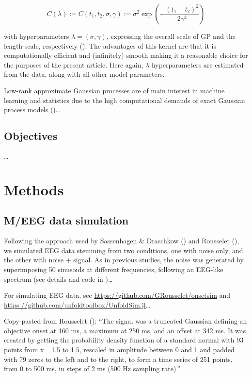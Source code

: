 \documentclass[
  doc,
  floatsintext,
  longtable,
  a4paper,
  nolmodern,
  notxfonts,
  notimes,
  colorlinks=true,linkcolor=blue,citecolor=blue,urlcolor=blue]{apa7}
\begin{document}
\[
C(\lambda):=C\left(t_1, t_2, \sigma, \gamma\right):=\sigma^2 \exp \left(-\frac{\left(t_1-t_2\right)^2}{2 \gamma^2}\right)
\]

with hyperparameters \(\lambda=(\sigma, \gamma)\), expressing the
overall scale of GP and the length-scale, respectively
(). The
advantages of this kernel are that it is computationally efficient and
(infinitely) smooth making it a reasonable choice for the purposes of
the present article. Here again, \(\lambda\) hyperparameters are
estimated from the data, along with all other model parameters.

Low-rank approximate Gaussian processes are of main interest in machine
learning and statistics due to the high computational demands of exact
Gaussian process models
()\ldots{}

\subsection{Objectives}\label{objectives}

\ldots{}

\section{Methods}\label{methods}

\subsection{M/EEG data simulation}\label{meeg-data-simulation}

Following the approach used by Sassenhagen \& Draschkow
() and Rousselet
(), we simulated EEG data
stemming from two conditions, one with noise only, and the other with
noise + signal. As in previous studies, the noise was generated by
superimposing 50 sinusoids at different frequencies, following an
EEG-like spectrum (see details and code in
)\ldots{}

For simulating EEG data, see
\url{https://github.com/GRousselet/onsetsim} and
\url{https://github.com/unfoldtoolbox/UnfoldSim.jl}\ldots{}

Copy-pasted from Rousselet ():
``The signal was a truncated Gaussian defining an objective onset at 160
ms, a maximum at 250 ms, and an offset at 342 ms. It was created by
getting the probability density function of a standard normal with 93
points from x= 1.5 to 1.5, rescaled in amplitude between 0 and 1 and
padded with 79 zeros to the left and to the right, to form a time series
of 251 points, from 0 to 500 ms, in steps of 2 ms (500 Hz sampling
rate).''
\end{document}
